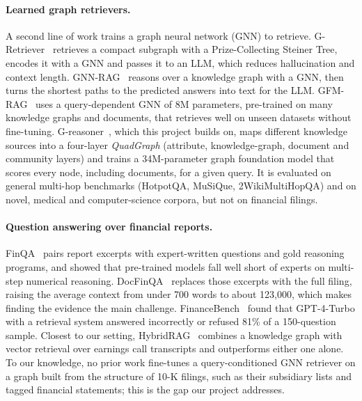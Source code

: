 \documentclass[10pt,twocolumn,letterpaper]{article}
\begin{document}
\paragraph{Learned graph retrievers.}
A second line of work trains a graph neural network (GNN) to retrieve.
G-Retriever~\cite{he2024gretriever} retrieves a compact subgraph with a Prize-Collecting Steiner
Tree, encodes it with a GNN and passes it to an LLM, which reduces hallucination and context length.
GNN-RAG~\cite{mavromatis2025gnnrag} reasons over a knowledge graph with a GNN, then turns the
shortest paths to the predicted answers into text for the LLM. GFM-RAG~\cite{luo2025gfmrag} uses a
query-dependent GNN of 8M parameters, pre-trained on many knowledge graphs and documents, that
retrieves well on unseen datasets without fine-tuning. G-reasoner~\cite{luo2026greasoner}, which this
project builds on, maps different knowledge sources into a four-layer \emph{QuadGraph} (attribute,
knowledge-graph, document and community layers) and trains a 34M-parameter graph foundation model
that scores every node, including documents, for a given query. It is evaluated on general multi-hop
benchmarks (HotpotQA, MuSiQue, 2WikiMultiHopQA) and on novel, medical and computer-science
corpora, but not on financial filings.

\paragraph{Question answering over financial reports.}
FinQA~\cite{chen2021finqa} pairs report excerpts with expert-written questions and gold reasoning
programs, and showed that pre-trained models fall well short of experts on multi-step numerical
reasoning. DocFinQA~\cite{reddy2024docfinqa} replaces those excerpts with the full filing, raising
the average context from under 700 words to about 123,000, which makes finding the evidence the main
challenge. FinanceBench~\cite{islam2023financebench} found that GPT-4-Turbo with a retrieval system
answered incorrectly or refused 81\% of a 150-question sample. Closest to our setting,
HybridRAG~\cite{sarmah2024hybridrag} combines a knowledge graph with vector retrieval over earnings
call transcripts and outperforms either one alone. To our knowledge, no prior work fine-tunes a
query-conditioned GNN retriever on a graph built from the structure of 10-K filings, such as their
subsidiary lists and tagged financial statements; this is the gap our project addresses.

\end{document}
